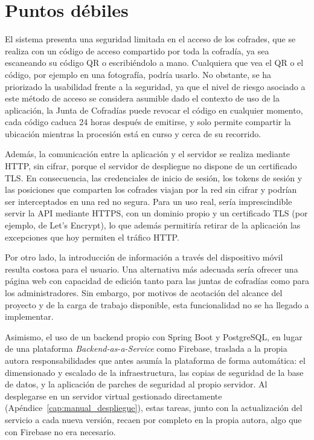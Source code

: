 \section{Puntos débiles}\label{cap:puntosDebiles}

El sistema presenta una seguridad limitada en el acceso de los cofrades, que se realiza con un código de acceso compartido por toda la cofradía, ya sea escaneando su código QR o escribiéndolo a mano. Cualquiera que vea el QR o el código, por ejemplo en una fotografía, podría usarlo. No obstante, se ha priorizado la usabilidad frente a la seguridad, ya que el nivel de riesgo asociado a este método de acceso se considera asumible dado el contexto de uso de la aplicación, la Junta de Cofradías puede revocar el código en cualquier momento, cada código caduca 24 horas después de emitirse, y solo permite compartir la ubicación mientras la procesión está en curso y cerca de su recorrido.

Además, la comunicación entre la aplicación y el servidor se realiza mediante HTTP, sin cifrar, porque el servidor de despliegue no dispone de un certificado TLS. En consecuencia, las credenciales de inicio de sesión, los tokens de sesión y las posiciones que comparten los cofrades viajan por la red sin cifrar y podrían ser interceptados en una red no segura. Para un uso real, sería imprescindible servir la API mediante HTTPS, con un dominio propio y un certificado TLS (por ejemplo, de Let's Encrypt), lo que además permitiría retirar de la aplicación las excepciones que hoy permiten el tráfico HTTP.

Por otro lado, la introducción de información a través del dispositivo móvil resulta costosa para el usuario. Una alternativa más adecuada sería ofrecer una página web con capacidad de edición tanto para las juntas de cofradías como para los administradores. Sin embargo, por motivos de acotación del alcance del proyecto y de la carga de trabajo disponible, esta funcionalidad no se ha llegado a implementar.

Asimismo, el uso de un backend propio con Spring Boot y PostgreSQL, en lugar de una plataforma \emph{Backend-as-a-Service} como Firebase, traslada a la propia autora responsabilidades que antes asumía la plataforma de forma automática: el dimensionado y escalado de la infraestructura, las copias de seguridad de la base de datos, y la aplicación de parches de seguridad al propio servidor. Al desplegarse en un servidor virtual gestionado directamente (Apéndice~\ref{cap:manual_despliegue}), estas tareas, junto con la actualización del servicio a cada nueva versión, recaen por completo en la propia autora, algo que con Firebase no era necesario.
 
